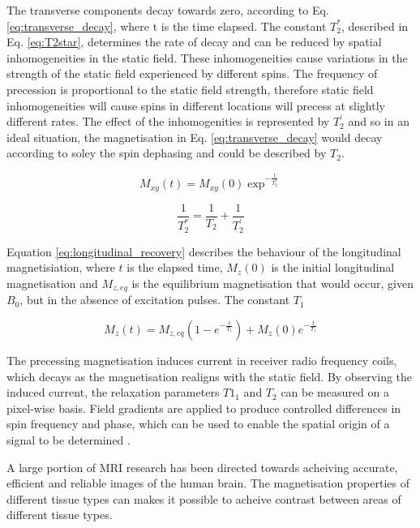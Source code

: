 \documentclass[review]{elsarticle}
\begin{document}
The transverse components decay towards zero, according to Eq. \eqref{eq:transverse_decay}, where t is the time elapsed. The constant $T^{*}_{2}$, described in Eq. \eqref{eq:T2star}, determines the rate of decay and can be reduced by spatial inhomogeneities in the static field. These inhomogeneities cause variations in the strength of the static field experienced by different spins. The frequency of precession is proportional to the static field strength, therefore static field inhomogeneities will cause spins in different locations will precess at slightly different rates. The effect of the inhomogenities is represented by $T^{'}_{2}$ and so in an ideal situation, the magnetisation in Eq. \eqref{eq:transverse_decay} would decay according to soley the spin dephasing and could be described by $T_{2}$.

\begin{equation} \label{eq:transverse_decay}
M_{xy} (t) = M_{xy}(0)\exp^{-\frac{t}{T^{*}_{2}}}
\end{equation}

\begin{equation} \label{eq:T2star}
 \frac{1}{T^{*}_{2}} = \frac{1}{T_{2}} + \frac{1}{T^{'}_2}
\end{equation}

Equation \eqref{eq:longitudinal_recovery} describes the behaviour of the longitudinal magnetisiation, where $ t $ is the elapsed time, $M_{z}(0)$ is the initial longitudinal magnetisation and $M_{z,eq}$ is the equilibrium magnetisation that would occur, given $B_0$, but in the absence of excitation pulses. The constant $T_1$

\begin{equation} \label{eq:longitudinal_recovery}
M_{z} (t) = M_{z,eq}(1 - e^{-\frac{t}{T_1}} ) + M_{z}(0)e^{-\frac{t}{T_1} } 
\end{equation}

The precessing magnetisation induces current in receiver radio frequency coils, which decays as the magnetisation realigns with the static field. By observing the induced current, the relaxation parameters $T1_1$ and $T_2$ can be measured on a pixel-wise basis. Field gradients are applied to produce controlled differences in spin frequency and phase, which can be used to enable the spatial origin of a signal to be determined \cite{haackemagnetic}.

A large portion of MRI research has been directed towards acheiving accurate, efficient and reliable images of the human brain.  The magnetisation properties of different tissue types can makes it possible to acheive contrast between areas of different tissue types.
\end{document}
